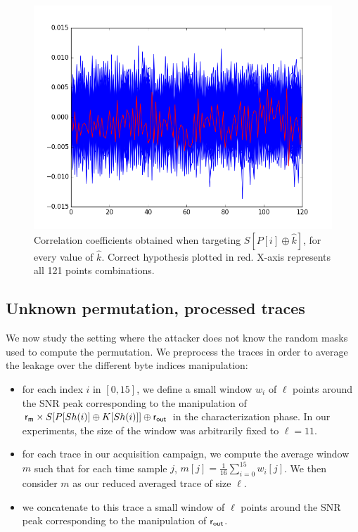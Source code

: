 \begin{figure}[H]
	\centering 
	\includegraphics[scale=0.35]{figures/CPA2O_trickedZ1.png}
	\caption{Correlation coefficients obtained when targeting $S[P[i]\oplus \hat{k}] $, for every value of $\hat{k}$. Correct hypothesis plotted in red. X-axis represents all 121 points combinations.}
	\label{fig:CPA2O_trickedZ1}
\end{figure}


\subsection{Unknown permutation, processed traces}
We now study the setting where the attacker does not know the random masks used to compute the permutation.
We preprocess the traces in order to average the leakage over the different byte indices manipulation:
\begin{itemize}
	\item for each index $i$ in $[0,15]$, we define a small window $w_i$ of $\ell$ points around the SNR peak corresponding to the manipulation of $\mathsf{r_m} \times S[P[Sh(i)] \oplus K[Sh(i)]]\oplus \mathsf{r_{out}}$ in the characterization phase. In our experiments, the size of the window was arbitrarily fixed to $\ell=11$.
	\item for each trace in our acquisition campaign, we compute the average window $m$ such that for each time sample $j$, $m[j]=\frac{1}{16}\sum_{i=0}^{15} w_i[j]$. We then consider $m$ as our reduced averaged trace of size $\ell$.
	\item we concatenate to this trace a small window of $\ell$ points around the SNR peak corresponding to the manipulation of $\mathsf{r_{out}}$.
\end{itemize}

